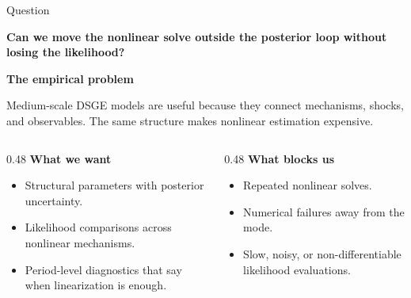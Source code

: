\documentclass[aspectratio=169,10pt]{beamer}
\newcommand{\claim}[1]{%
  \begin{center}
  \parbox{0.94\linewidth}{\centering\large\bfseries #1}
  \end{center}
}
\newcommand{\softline}{\par\vspace{0.12em}\noindent{\color{DeepBlue!45}\rule{0.88\linewidth}{0.45pt}}\par\vspace{0.25em}}
\begin{document}
\begin{frame}{Question}
\claim{Can we move the nonlinear solve outside the posterior loop without losing the likelihood?}

\vspace{0.8em}
\textbf{The empirical problem}

\softline
Medium-scale DSGE models are useful because they connect mechanisms, shocks,
and observables. The same structure makes nonlinear estimation expensive.

\vspace{0.7em}
\begin{columns}[T,onlytextwidth]
\begin{column}{0.48\textwidth}
\textbf{What we want}
\begin{itemize}
  \item Structural parameters with posterior uncertainty.
  \item Likelihood comparisons across nonlinear mechanisms.
  \item Period-level diagnostics that say when linearization is enough.
\end{itemize}
\end{column}
\begin{column}{0.48\textwidth}
\textbf{What blocks us}
\begin{itemize}
  \item Repeated nonlinear solves.
  \item Numerical failures away from the mode.
  \item Slow, noisy, or non-differentiable likelihood evaluations.
\end{itemize}
\end{column}
\end{columns}
\end{frame}
\end{document}
